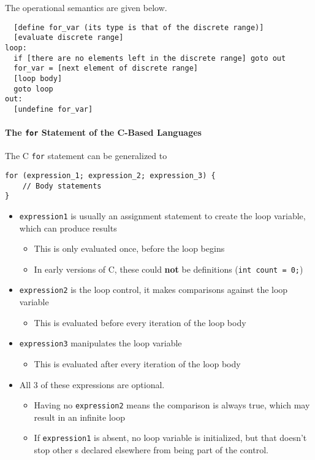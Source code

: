 The operational semantics are given below.
\begin{verbatim}
  [define for_var (its type is that of the discrete range)]
  [evaluate discrete range]
loop:
  if [there are no elements left in the discrete range] goto out
  for_var = [next element of discrete range]
  [loop body]
  goto loop
out:
  [undefine for_var]
\end{verbatim}

\paragraph{The \texttt{for} Statement of the C-Based Languages}\label{par:Counter_Controlled_Loops-C_Langs}
The C \texttt{for} statement can be generalized to
\begin{verbatim}
for (expression_1; expression_2; expression_3) {
    // Body statements
}
\end{verbatim}
\begin{itemize}[noitemsep]
\item \texttt{expression\textunderscore{}1} is usually an assignment statement to create the loop variable, which can produce results
  \begin{itemize}[noitemsep]
  \item This is only evaluated once, before the loop begins
  \item In early versions of C, these could \textbf{not} be definitions (\texttt{int count = 0;})
  \end{itemize}
\item \texttt{expression\textunderscore{}2} is the loop control, it makes comparisons against the loop variable
  \begin{itemize}[noitemsep]
  \item This is evaluated before every iteration of the loop body
  \end{itemize}
\item \texttt{expression\textunderscore{}3} manipulates the loop variable
  \begin{itemize}[noitemsep]
  \item This is evaluated after every iteration of the loop body
  \end{itemize}
\item All 3 of these expressions are optional.
  \begin{itemize}[noitemsep]
  \item Having no \texttt{expression\textunderscore{}2} means the comparison is always true, which may result in an infinite loop
  \item If \texttt{expression\textunderscore{}1} is absent, no loop variable is initialized, but that doesn't stop other s declared elsewhere from being part of the control.
  \end{itemize}
\end{itemize}

